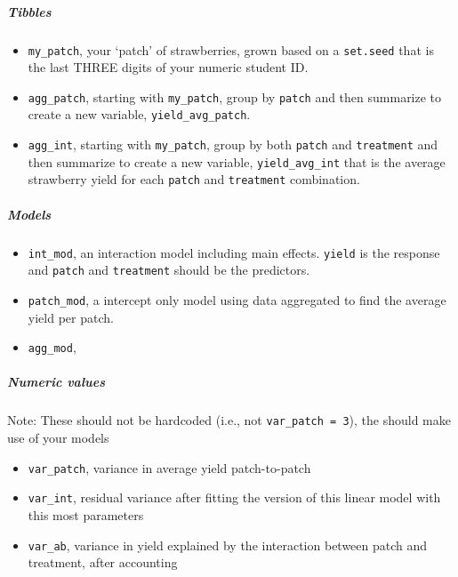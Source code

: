 \documentclass[
  openany]{book}
\begin{document}
\hypertarget{tibbles}{%
\subparagraph{Tibbles}\label{tibbles}}

\begin{itemize}
\item
  \texttt{my\_patch}, your `patch' of strawberries, grown based on a \texttt{set.seed} that is the last THREE digits of your numeric student ID.
\item
  \texttt{agg\_patch}, starting with \texttt{my\_patch}, group by \texttt{patch} and then summarize to create a new variable, \texttt{yield\_avg\_patch}.
\item
  \texttt{agg\_int}, starting with \texttt{my\_patch}, group by both \texttt{patch} and \texttt{treatment} and then summarize to create a new variable, \texttt{yield\_avg\_int} that is the average strawberry yield for each \texttt{patch} and \texttt{treatment} combination.
\end{itemize}

\hypertarget{models}{%
\subparagraph{Models}\label{models}}

\begin{itemize}
\item
  \texttt{int\_mod}, an interaction model including main effects. \texttt{yield} is the response and \texttt{patch} and \texttt{treatment} should be the predictors.
\item
  \texttt{patch\_mod}, a intercept only model using data aggregated to find the average yield per patch.
\item
  \texttt{agg\_mod},
\end{itemize}

\hypertarget{numeric-values}{%
\subparagraph{Numeric values}\label{numeric-values}}

Note: These should not be hardcoded (i.e., not \texttt{var\_patch\ =\ 3}), the should make use of your models

\begin{itemize}
\item
  \texttt{var\_patch}, variance in average yield patch-to-patch
\item
  \texttt{var\_int}, residual variance after fitting the version of this linear model with this most parameters
\item
  \texttt{var\_ab}, variance in yield explained by the interaction between patch and treatment, after accounting
\end{itemize}
\end{document}
